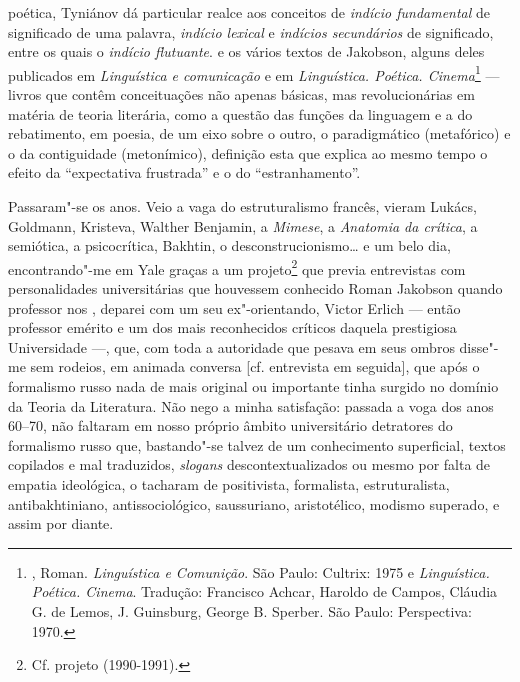 {{{{ poética, Tyniánov dá particular realce aos conceitos de \emph{indício
 fundamental} de significado de uma palavra, \emph{indício lexical}
 e \emph{indícios secundários} de significado, entre os quais o
 \emph{indício flutuante}.} e os vários textos de Jakobson, alguns
deles publicados em \emph{Linguística e comunicação} e em
\emph{Linguística. Poética. Cinema}\footnote{, Roman.
 \emph{Linguística e Comunição}. São Paulo: Cultrix: 1975 e
 \emph{Linguística. Poética. Cinema}. Tradução: Francisco Achcar, 
Haroldo de Campos, Cláudia G. de Lemos, J. Guinsburg, George B.
 Sperber. São Paulo: Perspectiva: 1970.} --- livros que contêm conceituações
não apenas básicas, mas revolucionárias em matéria de teoria literária,
como a questão das funções da linguagem e a do rebatimento, em poesia, de
um eixo sobre o outro, o paradigmático (metafórico) e o da contiguidade
(metonímico), definição esta que explica ao mesmo tempo o efeito da
``expectativa frustrada'' e o do ``estranhamento''.

Passaram"-se os anos. Veio a vaga do estruturalismo francês, vieram
Lukács, Goldmann, Kristeva, Walther Benjamin, a \emph{Mimese}, a
\emph{Anatomia da crítica}, a semiótica, a psicocrítica, Bakhtin, o
desconstrucionismo\ldots{} e um belo dia, encontrando"-me em Yale graças a um
projeto\footnote{Cf. projeto  (1990-1991).} que previa
entrevistas com personalidades universitárias que houvessem conhecido
Roman Jakobson quando professor nos , deparei com um seu
ex"-orientando, Victor Erlich --- então professor emérito e um dos mais
reconhecidos críticos daquela prestigiosa Universidade ---, que, com toda
a autoridade que pesava em seus ombros disse"-me sem rodeios, em animada
conversa [cf. entrevista em seguida], que após o formalismo russo nada de mais
original ou importante tinha surgido no domínio da Teoria da Literatura.
Não nego a minha satisfação: passada a voga dos anos 60--70, não faltaram
em nosso próprio âmbito universitário detratores do formalismo russo
que, bastando"-se talvez de um conhecimento superficial, textos
copilados e mal traduzidos, \emph{slogans} descontextualizados ou mesmo por
falta de empatia ideológica, o tacharam de positivista, formalista,
estruturalista, antibakhtiniano, antissociológico, saussuriano,
aristotélico, modismo superado, e assim por diante.

}}}
